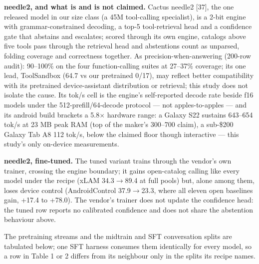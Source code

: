 \documentclass{article}
\begin{document}
\textbf{needle2, and what is and is not claimed.} Cactus needle2 [37], the one released
model in our size class (a 45M tool-calling specialist), is a 2-bit engine with
grammar-constrained decoding, a top-5 tool-retrieval head and a confidence
gate that abstains and escalates; scored through its own engine, catalogs above
five tools pass through the retrieval head and abstentions count as unparsed, folding coverage
and correctness together. As precision-when-answering (200-row audit):
90--100\% on the four function-calling suites at 27--37\% coverage; its one lead,
ToolSandbox (64.7 vs our pretrained 0/17), may reflect better compatibility with its pretrained
device-assistant distribution or retrieval; this study does not isolate the cause. Its tok/s cell is the
engine's self-reported decode rate beside f16 models under the 512-prefill/64-decode protocol
--- not apples-to-apples --- and its android build brackets a 5.8$\times$ hardware
range: a Galaxy S22 sustains 643--654 tok/s at 23 MB peak RAM (top of the maker's 300--700
claim), a sub-\$200 Galaxy Tab A8 112 tok/s, below the claimed floor though
interactive --- this study's only on-device measurements.


\textbf{needle2, fine-tuned.} The tuned variant trains through the vendor's own trainer,
crossing the engine boundary; it gains open-catalog calling like every
model under the recipe (xLAM 34.3$\rightarrow$89.4 at full pools) but, alone among them, loses
device control (AndroidControl 37.9$\rightarrow$23.3, where all eleven open baselines gain, +17.4 to
+78.0). The vendor's trainer does not update the confidence head: the tuned row
reports no calibrated confidence and does not share the abstention behaviour
above.


The pretraining streams and the midtrain and SFT conversation splits are tabulated
below; one SFT harness consumes them identically for
every model, so a row in Table 1 or 2 differs from its neighbour only in the splits its
recipe names.
\end{document}
